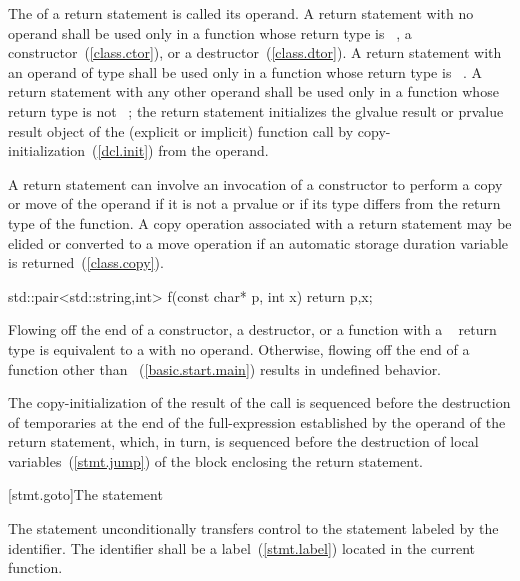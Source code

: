 \pnum
The 
of a return statement is called its operand. A return statement with
no operand shall be used only in a function whose return type is
\cv{}~, a constructor~(\ref{class.ctor}), or a
destructor~(\ref{class.dtor}).
%
%
A return statement with an operand of type  shall be used only
in a function whose return type is \cv{}~.
A return statement with any other operand shall be used only
in a function whose return type is not \cv{}~;
%
the return statement initializes the
glvalue result or prvalue result object of the (explicit or implicit) function call
by copy-initialization~(\ref{dcl.init}) from the operand.
\begin{note}
A return statement can involve
an invocation of a constructor to perform a copy or move of the operand
if it is not a prvalue or if its type differs from the return type of the function.
A copy operation associated with a return statement may be elided or
converted to a move operation if an automatic storage duration variable is returned~(\ref{class.copy}).
\end{note}
\begin{example}
\begin{codeblock}
std::pair<std::string,int> f(const char* p, int x) {
  return {p,x};
}
\end{codeblock}
\end{example}
Flowing off the end of
a constructor,
a destructor, or
a function with a \cv{}~ return type is
equivalent to a  with no operand.
Otherwise, flowing off the end of a function
other than ~(\ref{basic.start.main})
results in undefined behavior.

\pnum
The copy-initialization of the result of the call is sequenced before the
destruction of temporaries at the end of the full-expression established
by the operand of the return statement, which, in turn, is sequenced
before the destruction of local variables~(\ref{stmt.jump}) of the block
enclosing the return statement.

[stmt.goto]{The  statement}%

\pnum
The  statement unconditionally transfers control to the
statement labeled by the identifier. The identifier shall be a
%
label~(\ref{stmt.label}) located in the current function.

